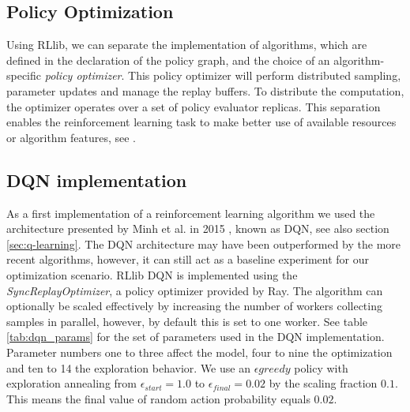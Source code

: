 \documentclass[12pt,a4paper]{article}
\begin{document}
\subsection{Policy Optimization}
Using RLlib, we can separate the implementation of algorithms, which are defined in the declaration of the policy graph, and the choice of an algorithm-specific {\it policy optimizer}. This policy optimizer will perform distributed sampling, parameter updates and manage the replay buffers. To distribute the computation, the optimizer operates over a set of policy evaluator replicas. This separation enables the reinforcement learning task to make better use of available resources or algorithm features, see \cite{Liang2017}.

\subsection{DQN implementation}
As a first implementation of a reinforcement learning algorithm we used the architecture presented by Minh et al. in 2015 \cite{Mnih2016}, known as DQN, see also section \ref{sec:q-learning}. The DQN architecture may have been outperformed by the more recent algorithms, however, it can still act as a baseline experiment for our optimization scenario. RLlib DQN is implemented using the {\it SyncReplayOptimizer}, a policy optimizer provided by Ray. The algorithm can optionally be scaled effectively by increasing the number of workers collecting samples in parallel, however, by default this is set to one worker. See table \ref{tab:dqn_params} for the set of parameters used in the DQN implementation. Parameter numbers one to three affect the model, four to nine the optimization and ten to 14 the exploration behavior. We use an $\epsilon greedy$ policy with exploration annealing from $\epsilon_{start} = 1.0$ to $\epsilon_{final} = 0.02$ by the scaling fraction $0.1$. This means the final value of random action probability equals $0.02$. 
\end{document}
